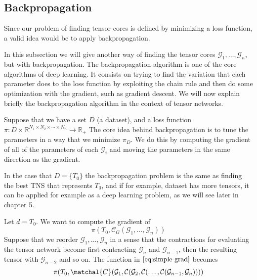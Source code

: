 \documentclass[11pt,a4paper,openright,oneside]{book}
\numberwithin{equation}{section}
\begin{document}
{%

\subsection{Backpropagation} \label{backpropagation}

Since our problem of finding tensor cores is defined by minimizing a loss function, a valid idea would be
to apply backpropagation.

In this subsection we will give another way of finding the tensor cores $\mathcal{G}_1, \dots, \mathcal{G}_n$, but with 
backpropagation. The backpropagation algorithm is one of the core algorithms of deep learning. It consists on
trying to find the variation that each parameter does to the loss function by exploiting the chain rule and
then do some optimization with the gradient, such as gradient descent. We will now explain briefly the backpropagation
algorithm in the context of tensor networks.


Suppose that we have a set $D$ (a dataset), and a loss function ${\pi: D \times \mathbb{R}^{N_1 \times N_2 \times \cdots \times N_n} \rightarrow \mathbb{R}_+}$
The core idea behind backpropagation is to tune the parameters in a way that
we minimize $\pi_D$. We do this by computing the gradient of all of the parameters of each $\mathcal{G}_i$ and moving 
the parameters in the same direction as the gradient.

In the case that $D = \{T_0\}$ the backpropagation problem is the same as finding the best TNS that represents $T_0$, and if
for example, dataset has more tensors, it can be applied for example as a deep learning problem, as we will see later in chapter 5.

Let $d = T_0$. We want to compute the gradient of
\begin{equation}
\pi(T_0, \mathcal{C}_G(\mathcal{G}_1, \dots, \mathcal{G}_n))
\label{eq:simple-grad}
\end{equation}
Suppose that we reorder $\mathcal{G}_1, \dots, \mathcal{G}_n$ in a sense that the contractions for evaluating the tensor
network become first contracting $\mathcal{G}_n$ and $\mathcal{G}_{n-1}$, then the resulting tensor with $\mathcal{G}_{n-2}$
and so on. The function in $\ref{eq:simple-grad}$ becomes
\begin{equation}
    \pi(T_0, \matchal{C}(\mathcal{G}_1, \mathcal{C}( \mathcal{G}_2, \mathcal{C}(\dots, \mathcal{C}(\mathcal{G}_{n-1}, \mathcal{G}_n))))
    \label{eq:extended-grad}
\end{equation}

}
\end{document}
